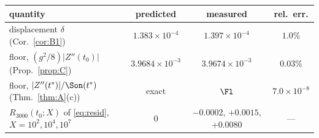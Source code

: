 \begin{tabular}{@{}lccc@{}}
\toprule
quantity & predicted & measured & rel.\ err.\\
\midrule
displacement $\delta$ (Cor.~\ref{cor:B1}) & $1.383\times10^{-4}$ & $1.397\times10^{-4}$ & $1.0\%$\\
floor, $(g^{2}/8)|Z''(t_{0})|$ (Prop.~\ref{prop:C}) & $3.9684\times10^{-3}$ & $3.9674\times10^{-3}$ & $0.03\%$\\
floor, $|Z''(t^{*})|/\Son(t^{*})$ (Thm.~\ref{thm:A}(c)) & exact & $\Fl$ & $7.0\times10^{-8}$\\
$R_{3000}(t_{0};X)$ of \eqref{eq:resid}, $X=10^{2},10^{4},10^{7}$ & $0$ & $-0.0002$, $+0.0015$, $+0.0080$ & ---\\
\bottomrule
\end{tabular}
